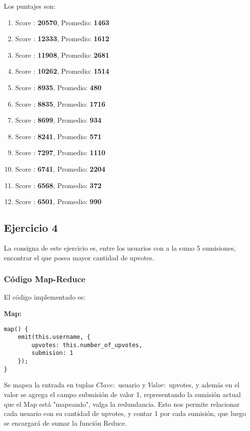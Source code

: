 Los puntajes son:

\begin{enumerate}

\item Score : \textbf{20570}, Promedio: \textbf{1463}
\item Score : \textbf{12333}, Promedio: \textbf{1612} 
\item Score : \textbf{11908}, Promedio: \textbf{2681} 
\item Score : \textbf{10262}, Promedio: \textbf{1514} 
\item Score : \textbf{8935}, Promedio: \textbf{480} 
\item Score : \textbf{8835}, Promedio: \textbf{1716} 
\item Score : \textbf{8699}, Promedio: \textbf{934} 
\item Score : \textbf{8241}, Promedio: \textbf{571} 
\item Score : \textbf{7297}, Promedio: \textbf{1110} 
\item Score : \textbf{6741}, Promedio: \textbf{2204} 
\item Score : \textbf{6568}, Promedio: \textbf{372} 
\item Score : \textbf{6501}, Promedio: \textbf{990} 


\end{enumerate}

\subsection{Ejercicio 4}

La consigna de este ejercicio es, entre los usuarios con a la sumo 5 sumisiones, encontrar el que posea mayor cantidad de
upvotes.

\subsubsection{C\'odigo Map-Reduce}

El c\'odigo implementado es:

\textbf{Map:}

\begin{lstlisting}
map() {
    emit(this.username, {
    	upvotes: this.number_of_upvotes,
    	submision: 1
    });
}
\end{lstlisting}

Se mapea la entrada en tuplas $Clave:$ usuario y $Valor:$ upvotes, y adem\'as en el valor se agrega el campo submisi\'on de valor 1, representando la sumisi\'on actual que el Map est\'a "mapeando", valga la redundancia. Esto nos permite relacionar cada usuario con su cantidad de upvotes, y contar 1 por cada sumisi\'on, que luego se encargar\'a de sumar la funci\'on Reduce.



